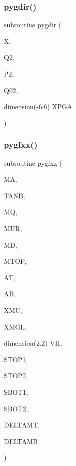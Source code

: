 \mbox{\label{pythia-6_84_824_8f_ae6cda6b3b8fc088943d6e62ea2b46fa3}} 
\subsubsection{\texorpdfstring{pygdir()}{pygdir()}}
{\footnotesize\ttfamily subroutine pygdir (\begin{DoxyParamCaption}\item[{}]{X,  }\item[{}]{Q2,  }\item[{}]{P2,  }\item[{}]{Q02,  }\item[{dimension(-\/6\+:6)}]{X\+P\+GA }\end{DoxyParamCaption})}

\mbox{\label{pythia-6_84_824_8f_a2b64fdfa9f23edaf0725fc21687a97f1}} 
\subsubsection{\texorpdfstring{pygfxx()}{pygfxx()}}
{\footnotesize\ttfamily subroutine pygfxx (\begin{DoxyParamCaption}\item[{}]{MA,  }\item[{}]{T\+A\+NB,  }\item[{}]{MQ,  }\item[{}]{M\+UR,  }\item[{}]{MD,  }\item[{}]{M\+T\+OP,  }\item[{}]{AT,  }\item[{}]{AB,  }\item[{}]{X\+MU,  }\item[{}]{X\+M\+GL,  }\item[{dimension(2,2)}]{VH,  }\item[{}]{S\+T\+O\+P1,  }\item[{}]{S\+T\+O\+P2,  }\item[{}]{S\+B\+O\+T1,  }\item[{}]{S\+B\+O\+T2,  }\item[{}]{D\+E\+L\+T\+A\+MT,  }\item[{}]{D\+E\+L\+T\+A\+MB }\end{DoxyParamCaption})}

